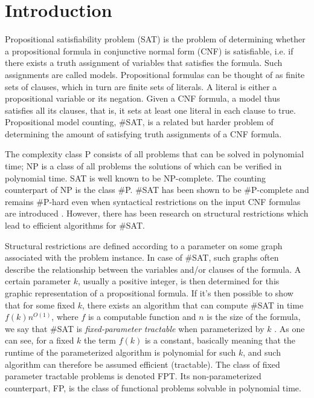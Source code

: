 \documentclass{article}
\begin{document}
\section{Introduction}

Propositional satisfiability problem (SAT) is the problem of determining whether a propositional formula in conjunctive normal form (CNF) is satisfiable, i.e. if there exists a truth assignment of variables that satisfies the formula.
Such assignments are called models.
Propositional formulas can be thought of as finite sets of clauses, which in turn are finite sets of literals.
A literal is either a propositional variable or its negation.
Given a CNF formula, a model thus satisfies all its clauses, that is, it sets at least one literal in each clause to true.
Propositional model counting, \#SAT, is a related but harder problem of determining the amount of satisfying truth assignments of a CNF formula.

The complexity class P consists of all problems that can be solved in polynomial time; NP is a class of all problems the solutions of which can be verified in polynomial time. SAT is well known to be NP-complete.
The counting counterpart of NP is the class \#P.
\#SAT has been shown to be \#P-complete and remains \#P-hard even when syntactical restrictions on the input CNF formulas are introduced \cite{DBLP:conf/sat/GanianS17}.
However, there has been research on structural restrictions \cite{DBLP:conf/sat/GanianS17, DBLP:conf/sat/CapelliDM14, DBLP:conf/sat/GanianPSSS22, DBLP:conf/sat/SaetherTV14, DBLP:journals/dam/FischerMR08} which lead to efficient algorithms for \#SAT.

Structural restrictions are defined according to a parameter on some graph associated with the problem instance.
In case of \#SAT, such graphs often describe the relationship between the variables and/or clauses of the formula.
A certain parameter $k$, usually a positive integer, is then determined for this graphic representation of a propositional formula. 
If it's then possible to show that for some fixed $k$, there exists an algorithm that can compute \#SAT in time $f(k)n^{O(1)}$, where $f$ is a computable function and $n$ is the size of the formula, we say that \#SAT is {\em fixed-parameter tractable} when parameterized by $k$ \cite{DBLP:conf/sat/GanianS17}.
As one can see, for a fixed $k$ the term $f(k)$ is a constant, basically meaning that the runtime of the parameterized algorithm is polynomial for such $k$, and such algorithm can therefore be assumed efficient (tractable). The class of fixed parameter tractable problems is denoted FPT.
Its non-parameterized counterpart, FP, is the class of functional problems solvable in polynomial time.
\end{document}
